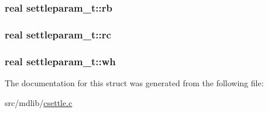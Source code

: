\hypertarget{structsettleparam__t_a7a15e34f91aef175d36326257836c761}{
\subsubsection[{rb}]{\setlength{\rightskip}{0pt plus 5cm}real {\bf settleparam\-\_\-t\-::rb}}}\label{structsettleparam__t_a7a15e34f91aef175d36326257836c761}
\hypertarget{structsettleparam__t_af46096098938e85722b17b8dedd73cde}{
\subsubsection[{rc}]{\setlength{\rightskip}{0pt plus 5cm}real {\bf settleparam\-\_\-t\-::rc}}}\label{structsettleparam__t_af46096098938e85722b17b8dedd73cde}
\hypertarget{structsettleparam__t_acc04ca77c97945872b78cfa768c2a3c5}{
\subsubsection[{wh}]{\setlength{\rightskip}{0pt plus 5cm}real {\bf settleparam\-\_\-t\-::wh}}}\label{structsettleparam__t_acc04ca77c97945872b78cfa768c2a3c5}


\-The documentation for this struct was generated from the following file\-:\begin{DoxyCompactItemize}
\item 
src/mdlib/\hyperlink{csettle_8c}{csettle.\-c}\end{DoxyCompactItemize}
